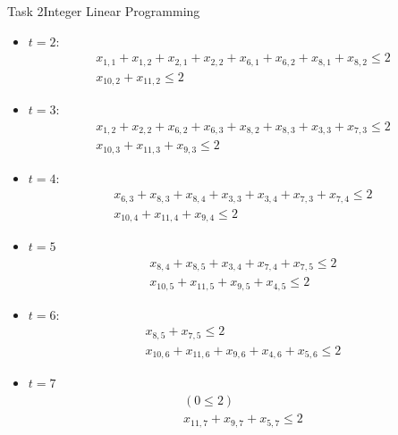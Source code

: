 \begin{frame}[allowframebreaks]{Task 2}{Integer Linear Programming}
\begin{solutionnoinc}
\begin{itemize}
\begin{itemize}
        \[ \begin{gathered}
          x_{1,1}+x_{2,1}+x_{6,1}+x_{8,1} \leq 2 \\
          x_{10,1} \leq 2
          \end{gathered}
        \]
      \item $t=2$:
        \[
          \begin{gathered}
          x_{1,1}+x_{1,2}+x_{2,1}+x_{2,2}+x_{6,1}+x_{6,2}+x_{8,1}+x_{8,2} \leq 2 \\
          x_{10,2}+x_{11,2} \leq 2
          \end{gathered}
        \]
      \item $t=3$:
        \[
          \begin{gathered}
          x_{1,2}+x_{2,2}+x_{6,2}+x_{6,3}+x_{8,2}+x_{8,3}+x_{3,3}+x_{7,3} \leq 2 \\
          x_{10,3}+x_{11,3}+x_{9,3} \leq 2
          \end{gathered}
        \]
      \end{itemize}
    \end{itemize}
  \end{solutionnoinc}
  \begin{solution}
    \begin{itemize}
    \item $t=4$:
      \[
      \begin{gathered}
      x_{6,3}+x_{8,3}+x_{8,4}+x_{3,3}+x_{3,4}+x_{7,3}+x_{7,4} \leq 2 \\
      x_{10,4}+x_{11,4}+x_{9,4} \leq 2
      \end{gathered}
      \]
    \item $t=5$
      \[
      \begin{gathered}
      x_{8,4}+x_{8,5}+x_{3,4}+x_{7,4}+x_{7,5} \leq 2 \\
      x_{10,5}+x_{11,5}+x_{9,5}+x_{4,5} \leq 2
      \end{gathered}
      \]
    \item $t=6$:
      \[
      \begin{gathered}
      x_{8,5}+x_{7,5} \leq 2 \\
      x_{10,6}+x_{11,6}+x_{9,6}+x_{4,6}+x_{5,6} \leq 2
      \end{gathered}
      \]
    \item $t=7$
      \[
      \begin{gathered}
      (0 \leq 2) \\
      x_{11,7}+x_{9,7}+x_{5,7} \leq 2
      \end{gathered}
      \]
    \end{itemize}
  \end{solution}
\end{frame}
